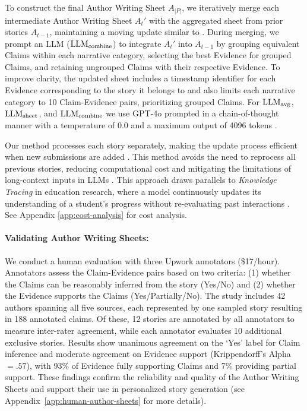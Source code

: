 To construct the final Author Writing Sheet $A_{|P|}$, we iteratively merge each intermediate Author Writing Sheet $A_t'$ with the aggregated sheet from prior stories $A_{t-1}$, maintaining a moving update similar to \citep{chang2023booookscore}. During merging, we prompt an LLM (\(\text{LLM\textsubscript{combine}}\)) to integrate $A_t'$ into $A_{t-1}$ by grouping equivalent Claims within each narrative category, selecting the best Evidence for grouped Claims, and retaining ungrouped Claims with their respective Evidence. To improve clarity, the updated sheet includes a timestamp identifier for each Evidence corresponding to the story it belongs to and also limits each narrative category to 10 Claim-Evidence pairs, prioritizing grouped Claims. For \(\text{LLM\textsubscript{avg}}\), \(\text{LLM\textsubscript{sheet}}\), and \(\text{LLM\textsubscript{combine}}\) we use GPT-4o prompted in a chain-of-thought manner with a temperature of 0.0 and a maximum output of 4096 tokens \citep{wei2022chain, shashidhar-etal-2024-unsupervised}.

Our method processes each story separately, making the update process efficient when new submissions are added \citep{yeh2024ghostwriter, yuan2022wordcraft}. This method avoids the need to reprocess all previous stories, reducing computational cost and mitigating the limitations of long-context inputs in LLMs \citep{zhou2023don, magar-schwartz-2022-data, li2024long}. This approach draws parallels to \textit{Knowledge Tracing} in education research, where a model continuously updates its understanding of a student's progress without re-evaluating past interactions \citep{liu-etal-2022-open, scarlatos2024exploring}. See Appendix \ref{app:cost-analysis} for cost analysis.



\paragraph{Validating Author Writing Sheets:}

We conduct a human evaluation with three Upwork annotators (\$17/hour). Annotators assess the Claim-Evidence pairs based on two criteria: (1) whether the Claims can be reasonably inferred from the story (Yes/No) and (2) whether the Evidence supports the Claims (Yes/Partially/No). The study includes 42 authors spanning all five sources, each represented by one sampled story resulting in 188 annotated claims. Of these, 12 stories are annotated by all annotators to measure inter-rater agreement, while each annotator evaluates 10 additional exclusive stories. Results show unanimous agreement on the `Yes' label for Claim inference and moderate agreement on Evidence support (Krippendorff’s Alpha$=.57$), with 93\% of Evidence fully supporting Claims and 7\% providing partial support. These findings confirm the reliability and quality of the Author Writing Sheets and support their use in personalized story generation (see Appendix~\ref{app:human-author-sheets} for more details).

